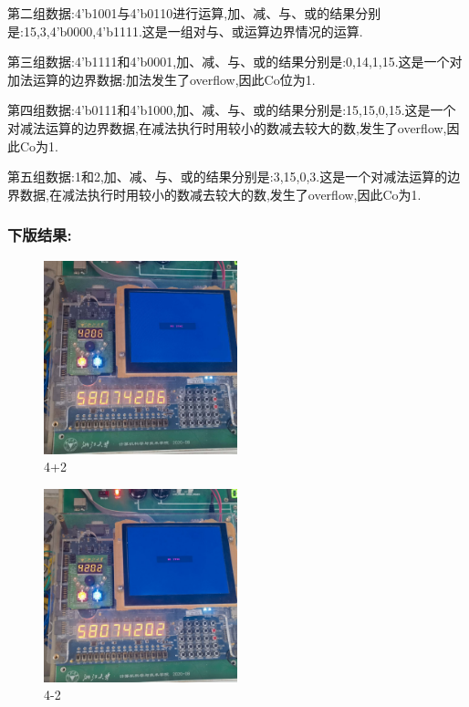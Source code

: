 \documentclass{article}
\begin{document}
第二组数据:4'b1001与4'b0110进行运算,加、减、与、或的结果分别是:15,3,4'b0000,4'b1111.这是一组对与、或运算边界情况的运算.

第三组数据:4'b1111和4'b0001,加、减、与、或的结果分别是:0,14,1,15.这是一个对加法运算的边界数据:加法发生了overflow,因此Co位为1.

第四组数据:4'b0111和4'b1000,加、减、与、或的结果分别是:15,15,0,15.这是一个对减法运算的边界数据,在减法执行时用较小的数减去较大的数,发生了overflow,因此Co为1.

第五组数据:1和2,加、减、与、或的结果分别是:3,15,0,3.这是一个对减法运算的边界数据,在减法执行时用较小的数减去较大的数,发生了overflow,因此Co为1.

\subsubsection*{下版结果:}
    \begin{figure}[H]
    \centering
    \includegraphics[width=0.5\textwidth]{lab8/11.jpg}
    \caption{\label{Lab8}4+2}
    \end{figure}

    \begin{figure}[H]
    \centering
    \includegraphics[width=0.5\textwidth]{lab8/12.jpg}
    \caption{\label{Lab8}4-2}
    \end{figure}
\end{document}
